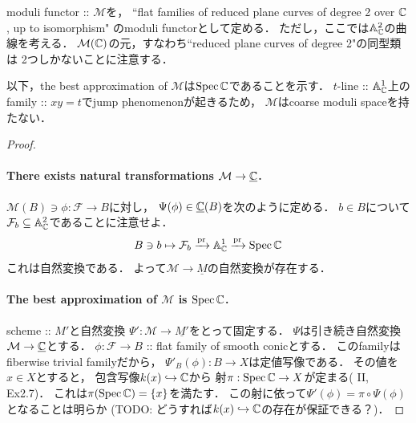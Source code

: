 \documentclass[a4paper]{jsarticle}
\newcommand{\famF}{\mathcal{F}}
\newcommand{\ftor}[1]{\underline{#1}}
\newcommand{\ftorM}{\mathcal{M}}
\begin{document}
    \begin{Example}
        moduli functor :: $\ftorM$を，
        ``flat families of reduced plane curves of degree 2 over $\mathbb{C}$, up to isomorphism"
        のmoduli functorとして定める．
        ただし，ここでは$\mathbb{A}_{\mathbb{C}}^2$の曲線を考える．
        $\ftorM(\C)$の元，すなわち``reduced plane curves of degree 2"の同型類は
        2つしかないことに注意する．

        以下，the best approximation of $\ftorM$は$\operatorname{Spec} \mathbb{C}$であることを示す．
        $t$-line :: $\mathbb{A}_{\mathbb{C}}^1$上のfamily :: $xy=t$でjump phenomenonが起きるため，
        $\ftorM$はcoarse moduli spaceを持たない．

        \begin{proof}
        \paragraph{There exists natural transformations $\ftorM \to \ftor{\C}$.}
        $\ftorM(B) \ni \phi: \famF \to B$に対し，
        $\Psi(\phi) \in \ftor{\C}(B)$を次のように定める．
        $b \in B$について$\famF_b \subseteq \affine^2_{\C}$であることに注意せよ．
        \[ B \ni b \mapsto \famF_b \xrightarrow{\pr} \affine^1_{\C} \xrightarrow{\pr} \Spec \C \]
        これは自然変換である．
        よって$\ftorM \to \ftor{M}$の自然変換が存在する．

        \paragraph{The best approximation of $\ftorM$ is $\operatorname{Spec} \mathbb{C}$.}
        scheme :: $M'$と自然変換
        $\Psi': \ftorM \to \ftor{M'}$をとって固定する．
        $\Psi$は引き続き自然変換$\ftorM \to \ftor{\C}$とする．
        $\phi: \famF \to B$ :: flat family of smooth conicとする．
        このfamilyはfiberwise trivial familyだから，
        $\Psi'_B(\phi): B \to X$は定値写像である．
        その値を$x \in X$とすると，
        包含写像$k(x) \hookrightarrow \mathbb{C}$から
        射$\pi: \operatorname{Spec} \mathbb{C} \to X$が定まる(\cite{HarAG} II, Ex2.7)．
        これは$\pi(\operatorname{Spec} \mathbb{C})=\{ x \}$を満たす．
        この射に依って$\Psi'(\phi)=\pi \circ \Psi(\phi)$となることは明らか
        (TODO: どうすれば$k(x) \hookrightarrow \mathbb{C}$の存在が保証できる？)．
        \end{proof}
    \end{Example}

\end{document}
